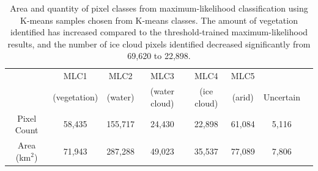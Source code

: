 \documentclass[12pt]{article}
\begin{document}
\begin{table}[h!]
    \centering
    \begin{tabular}{c|ccccccc}
        & {\footnotesize MLC1} & {\footnotesize MLC2} & {\footnotesize MLC3} & {\footnotesize MLC4} & {\footnotesize MLC5} & \\
        & {\footnotesize (vegetation)} & {\footnotesize (water)} & {\footnotesize (water cloud)} & {\footnotesize (ice cloud)} & {\footnotesize (arid)} & {\footnotesize Uncertain} \\
    \hline
    Pixel Count & 58,435 & 155,717 & 24,430 & 22,898 & 61,084 & 5,116\\
    Area (km$^2$) & 71,943 & 287,288 & 49,023 & 35,537 & 77,089 & 7,806\\
    \end{tabular}
    \caption{Area and quantity of pixel classes from maximum-likelihood classification using K-means samples chosen from K-means classes. The amount of vegetation identified has increased compared to the threshold-trained maximum-likelihood results, and the number of ice cloud pixels identified decreased significantly from 69,620 to 22,898.}
    \label{mlc_km_areas}
\end{table}

\vspace{-1.5em}

\begin{table}[h!]
\centering
    \begin{center}
    \end{center}

    \vspace{-.9em}

\caption{Confusion matrix comparing K-means samples to subsequent MLC results.}
\label{confusion_samples_km-mlc_km}
\end{table}
\end{document}

